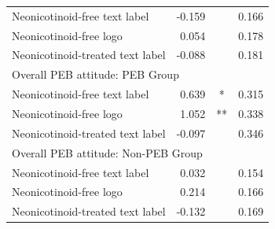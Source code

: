 \begin{tabular}{l r c r}
\hline
Neonicotinoid-free text label & -0.159 &  & 0.166 \\
Neonicotinoid-free logo &  0.054 &  & 0.178 \\
Neonicotinoid-treated text label & -0.088 &  & 0.181 \\
\hline
\multicolumn{4}{l}{Overall PEB attitude: PEB Group} \\
\hline
Neonicotinoid-free text label &  0.639 & * & 0.315 \\
Neonicotinoid-free logo &  1.052 & ** & 0.338 \\
Neonicotinoid-treated text label & -0.097 &  & 0.346 \\
\hline
\multicolumn{4}{l}{Overall PEB attitude: Non-PEB Group} \\
\hline
Neonicotinoid-free text label &  0.032 &  & 0.154 \\
Neonicotinoid-free logo &  0.214 &  & 0.166 \\
Neonicotinoid-treated text label & -0.132 &  & 0.169 \\
\hline
\end{tabular}
